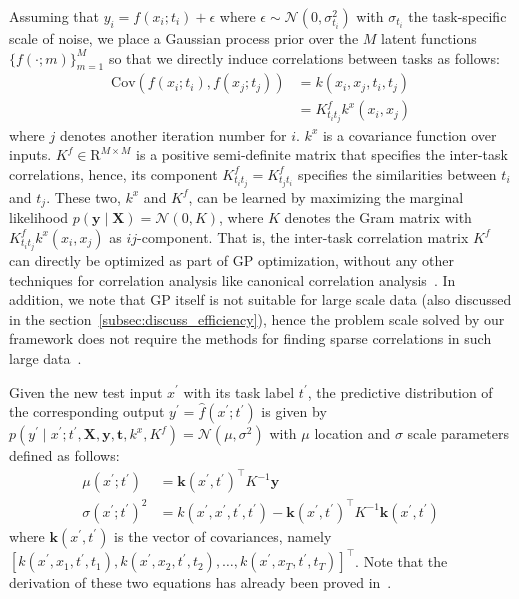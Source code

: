 \documentclass[twocolumn]{svjour3}          %
\begin{document}
Assuming that $y_i = f(x_i; t_i) + \epsilon$ where $\epsilon \sim \mathcal{N} (0, \sigma^2_{t_i})$ with $\sigma_{t_i}$ the task-specific scale of noise, we place a Gaussian process prior over the $M$ latent functions $\{f(\cdot; m)\}_{m=1}^M$ so that we directly induce correlations between tasks as follows:
\begin{align}
    \mathrm{Cov}(f(x_i; t_i), f(x_j; t_j)) &= k(x_i, x_j, t_i, t_j)
    \nonumber\\
    &= K_{t_i t_j}^f k^x(x_i, x_j)
    \label{eq:bo_multi_cov}
\end{align}
where $j$ denotes another iteration number for $i$.
$k^x$ is a covariance function over inputs.
$K^f \in \mathrm{R}^{M \times M}$ is a positive semi-definite matrix that specifies the inter-task correlations, hence, its component $K_{t_i t_j}^f = K_{t_j t_i}^f$ specifies the similarities between $t_i$ and $t_j$.
These two, $k^x$ and $K^f$, can be learned by maximizing the marginal likelihood $p(\boldsymbol y \mid \boldsymbol X) = \mathcal{N} (0, K)$, where $K$ denotes the Gram matrix with $K_{t_i t_j}^f k^x(x_i, x_j)$ as $ij$-component.
That is, the inter-task correlation matrix $K^f$ can directly be optimized as part of GP optimization, without any other techniques for correlation analysis like canonical correlation analysis~\cite{hardoon2004canonical}.
In addition, we note that GP itself is not suitable for large scale data (also discussed in the section~\ref{subsec:discuss_efficiency}), hence the problem scale solved by our framework does not require the methods for finding sparse correlations in such large data~\cite{hardoon2011sparse}.

Given the new test input $x^\prime$ with its task label $t^\prime$, the predictive distribution of the corresponding output $y^\prime = \hat f(x^\prime; t^\prime)$ is given by $p(y^\prime \mid x^\prime; t^\prime, \boldsymbol X, \boldsymbol y, \boldsymbol t, k^x, K^f) = \mathcal{N}(\mu, \sigma^2)$ with $\mu$ location and $\sigma$ scale parameters defined as follows:
\begin{align}
    \mu(x^\prime; t^\prime) &= \boldsymbol k(x^\prime, t^\prime)^\top K^{-1} \boldsymbol y
    \label{eq:BO_multi_mu}\\
    \sigma(x^\prime; t^\prime)^2 &= k(x^\prime, x^\prime, t^\prime, t^\prime) - \boldsymbol k(x^\prime, t^\prime)^\top K^{-1} \boldsymbol k(x^\prime, t^\prime)
    \label{eq:BO_multi_scale}
\end{align}
where $\boldsymbol k(x^\prime, t^\prime)$ is the vector of covariances, namely $[k(x^\prime, x_1, t^\prime, t_1), k(x^\prime, x_2, t^\prime, t_2), \ldots, k(x^\prime, x_T, t^\prime, t_T)]^\top$.
Note that the derivation of these two equations has already been proved in~\cite{bonilla2008multi,swersky2013multi}.
\end{document}
